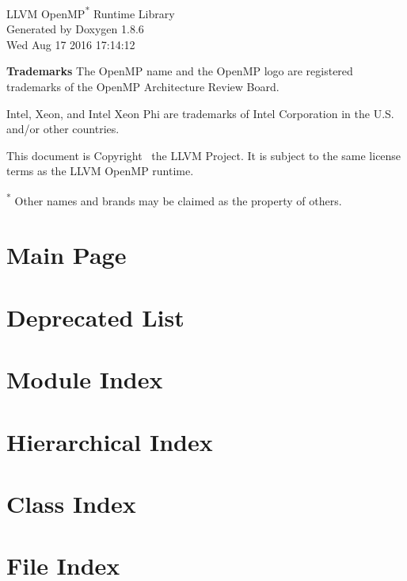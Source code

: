 \documentclass{book}
\begin{document}
\hypersetup{pageanchor=false,citecolor=blue}
\begin{titlepage}
\vspace*{7cm}
\begin{center}
{\Large LLVM OpenMP\textsuperscript{*} Runtime Library }\\
\vspace*{1cm}
{\large Generated by Doxygen 1.8.6 }\\
\vspace*{0.5cm}
{\small Wed Aug 17 2016 17:14:12 }\\
\end{center}
\end{titlepage}

{\bf Trademarks}
The OpenMP name and the OpenMP logo are registered trademarks of the OpenMP Architecture Review Board.

Intel, Xeon, and Intel Xeon Phi are trademarks of Intel Corporation in the U.S. and/or other countries.

This document is Copyright \textcopyright~\the\year the LLVM Project. It is
subject to the same license terms as the LLVM OpenMP runtime.
 
\textsuperscript{*} Other names and brands may be claimed as the property of others.

\clearemptydoublepage
{}
\tableofcontents
\clearemptydoublepage
{}
\hypersetup{pageanchor=true,citecolor=blue}
\chapter{Main Page}
\label{index}\hypertarget{index}{}
\chapter{Deprecated List}
\label{deprecated}
\hypertarget{deprecated}{}

\chapter{Module Index}

\chapter{Hierarchical Index}

\chapter{Class Index}

\chapter{File Index}

\end{document}
